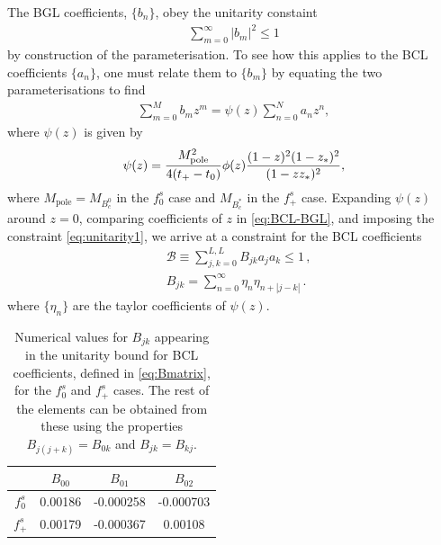 The BGL coefficients, $\{ b_n \}$, obey the unitarity constaint
\begin{align}
  \sum_{m=0}^{\infty} |b_m|^2 \leq 1
  \label{eq:unitarity1}
\end{align}
by construction of the parameterisation. To see how this applies to the BCL coefficients $\{ a_n \}$, one must relate them to $\{ b_m \}$ by equating the two parameterisations to find
\begin{align}
  \label{eq:BCL-BGL}
  \sum^M_{m=0} b_m z^m = \psi(z) \sum_{n=0}^N a_n z^n,
\end{align}
where $\psi(z)$ is given by
\begin{align}
  \psi(z) = { M_{\text{pole}}^2 \over 4(t_+ - t_0) } \phi(z) {(1-z)^2(1-z_*)^2\over (1-zz_*)^2 },
\end{align}
where $M_{\text{pole}}=M_{B_c^0}$ in the $f^s_0$ case and $M_{B_c^*}$ in the $f^s_+$ case. Expanding $\psi(z)$ around $z=0$, comparing coefficients of $z$ in \eqref{eq:BCL-BGL}, and imposing the constraint \eqref{eq:unitarity1}, we arrive at a constraint for the BCL coefficients
\begin{align}
    \label{eq:unitarity2}
    &\mathcal{B} \equiv \sum_{j,k=0}^{L,L} B_{jk} a_j a_k \leq 1\,, \\
    &B_{jk} = \sum_{n=0}^{\infty} \eta_n \eta_{n+|j-k|}\,.
        \label{eq:Bmatrix}
\end{align}
where $\{\eta_n\}$ are the taylor coefficients of $\psi(z)$.

\begin{table}[htb!]
  \begin{center}
    \begin{tabular}{c c c c}
      \hline
      & $B_{00}$ & $B_{01}$ & $B_{02}$ \\ [0.5ex]
      \hline
      $f^s_0$ & 0.00186 & -0.000258 & -0.000703 \\ [0.5ex]
      $f^s_+$ & 0.00179 & -0.000367 & 0.00108 \\ [0.5ex]
      \hline
    \end{tabular}
  \end{center}
  \caption{Numerical values for $B_{jk}$ appearing in the unitarity bound for BCL coefficients, defined in \eqref{eq:Bmatrix}, for the $f^s_0$ and $f^s_+$ cases. The rest of the elements can be obtained from these using the properties $B_{j(j+k)}=B_{0k}$ and $B_{jk}=B_{kj}$. \label{tab:Bmatrix}}
\end{table}

